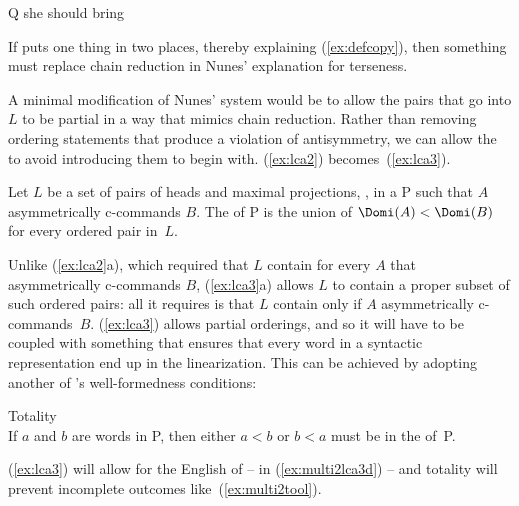 \documentclass[output=paper]{langsci/langscibook}
\begin{document}
\begin{exe}
	\ex \label{ex:multi2tool}
	Q she should bring
\end{exe}

If  puts one thing in two places, thereby explaining (\ref{ex:defcopy}), then something must replace chain reduction in Nunes' explanation for terseness.

A minimal modification of Nunes' system would be to allow the pairs that go into $L$ to be partial in a way that mimics chain reduction. Rather than removing ordering statements that produce a violation of antisymmetry, we can allow the  to avoid introducing them to begin with. (\ref{ex:lca2}) becomes~(\ref{ex:lca3}).

\begin{exe}
	\ex \label{ex:lca3}
	\begin{xlist}
		\ex Let $L$ be a set of pairs of heads and maximal projections, , in a  P such that $A$ asymmetrically c-commands $B$.
		\ex The  of P is the union of $\Domi(A) < \Domi(B)$ for every ordered pair in~$L$.
	\end{xlist}
\end{exe}

Unlike (\ref{ex:lca2}a), which required that $L$ contain  for every $A$
that asymmetrically c-commands $B$, (\ref{ex:lca3}a) allows $L$ to contain a
proper subset of such ordered pairs: all it requires is that $L$ contain
 only if $A$ asymmetrically c-commands~$B$. (\ref{ex:lca3}) allows
partial orderings, and so it will have to be coupled with something that
ensures that every word in a syntactic representation end up in the
linearization. This can be achieved by adopting another of 's
well-formedness conditions:

\begin{exe}
	\ex \label{ex:totality} Totality\\
	If $a$ and $b$ are words in P, then either $a<b$ or $b<a$ must be in the  of~P.
\end{exe}

(\ref{ex:lca3}) will allow for the English  of  -- in (\ref{ex:multi2lca3d}) -- and totality will prevent incomplete outcomes like~(\ref{ex:multi2tool}).
\end{document}
